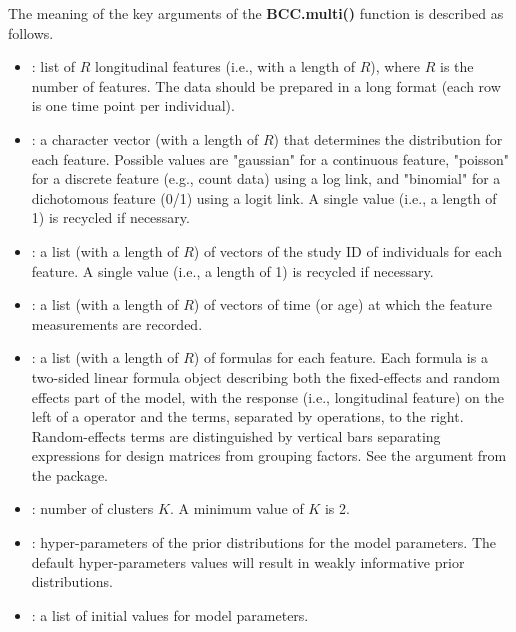 The meaning of the key arguments of the \textbf{BCC.multi()} function is described as follows. 

\begin{itemize}

	\item {}: list of $R$ longitudinal features (i.e., with a length of $R$), where $R$ is the number of features. The data should be prepared in a long format (each row is one time point per individual). 

	\item {}:  a character vector (with a length of $R$) that determines the distribution for each feature. Possible values are "gaussian" for a continuous feature, "poisson" for a discrete feature (e.g., count data) using a log link, and "binomial" for a dichotomous feature (0/1) using a logit link. A single value (i.e., a length of 1) is recycled if necessary. 

	\item {}: a list (with a length of $R$) of vectors of the study ID of individuals for each feature. A single value (i.e., a length of 1) is recycled if necessary. 

	\item {}: a list (with a length of $R$) of vectors of time (or age) at which the feature measurements are recorded. 

	\item {}: a list (with a length of $R$) of formulas for each feature. Each formula is a two-sided linear formula object describing both the fixed-effects and random effects part of the model, with the response (i.e., longitudinal feature) on the left of a \code{~} operator and the terms, separated by \code{+} operations, to the right. Random-effects terms are distinguished by vertical bars \code{(|)} separating expressions for design matrices from grouping factors. See the  argument from the  package.

	\item  {}: number of clusters $K$. A minimum value of $K$ is 2. 

	\item  {}: hyper-parameters of the prior distributions for the model parameters. The default hyper-parameters values will result in weakly informative prior distributions. 

	\item  {}: a list of initial values for model parameters.


\end{itemize}
